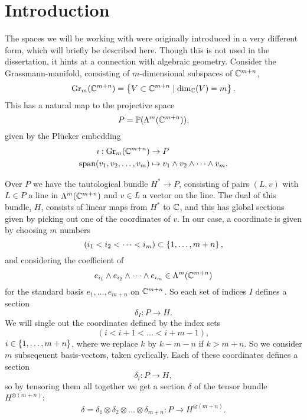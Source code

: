 \chapter{Introduction}
\label{chap:introduktion}

The spaces we will be working with were originally introduced
in a very different form, which will briefly be described here. Though
this is not used in the dissertation, it hints at a connection with
algebraic geometry.
Consider the Grassmann-manifold, consisting of $m$-dimensional
subspaces of $\mathbb{C}^{{m+n}}$,
\[ \mathrm{Gr}_m(\mathbb{C}^{{m+n}}) = \left\{ V \subset \mathbb{C}^{{m+n}} \mid
  \dim_{\mathbb{C}}(V) = m \right\}. \]
This has a natural map to the projective space
\[ P = \mathbb{P}(\Lambda^m(\mathbb{C}^{m+n})), \]
given by the Pl\"ucker embedding
\begin{align*}
  \imath : \mathrm{Gr}_m(\mathbb{C}^{{m+n}}) &\to P \\
  \operatorname{span}(v_1,v_2,\dots,v_m) &\mapsto v_1\wedge v_2\wedge \dots
                            \wedge v_m.
\end{align*}

Over $P$ we have the tautological bundle $H^*\to P$, consisting of
pairs $(L,v)$ with $L \in P$ a line in $\Lambda^m(\mathbb{C}^{m+n})$ and $v\in
L$ a vector on the line. The dual of
this bundle, $H$, consists of linear maps from $H^*$ to $\mathbb{C}$, and 
this has global sections given by picking out one of the
coordinates of $v$. In our case, a coordinate is given by choosing $m$
numbers
\[ (i_1 < i_2 < \dots < i_m) \subset \left\{ 1,\dots,m+n \right\}, \]
and considering the coefficient of
\[ e_{i_1}\wedge e_{i_2}\wedge \dots \wedge e_{i_m} \in
\Lambda^m(\mathbb{C}^{m+n}) \]
for the standard basis $e_1,\dots,e_{m+n}$ on $\mathbb{C}^{m+n}$. So each
set of indices $I$ defines a section
\[ \delta_I : P \to H. \]
We will single out the coordinates defined by the index sets
\[ (i < i+1 < \dots < i+m-1), \]
$i \in \left\{ 1,\dots,m+n \right\}$, where we replace $k$ by $k-m-n$ if
$k > m+n$. So we consider $m$ subseqeuent basis-vectors,
taken cyclically. Each of these coordinates defines a section
\[ \delta_i : P \to H, \]
so by tensoring them all together we get a section $\delta$ of the
tensor bundle $H^{\otimes(m+n)}$:
\[ \delta = \delta_1\otimes\delta_2\otimes\dots\otimes\delta_{m+n} : P
\to H^{\otimes(m+n)}. \]

